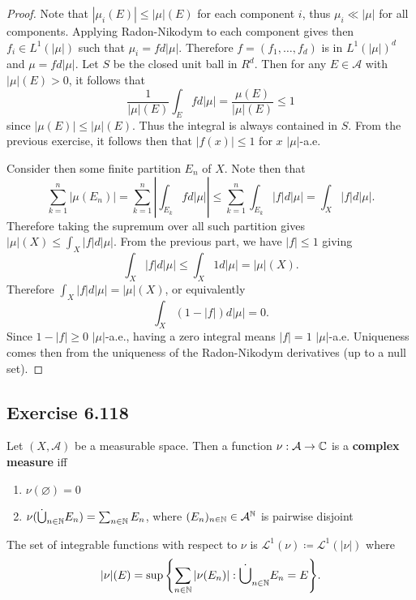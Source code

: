 \documentclass[hw_all.tex]{subfiles}
\begin{document}
\begin{proof}
    Note that $|\mu_i(E)| \leq |\mu|(E)$ for each component $i$, thus $\mu_i \ll |\mu|$ for all components. Applying Radon-Nikodym to each component gives then $f_i \in L^1(|\mu|)$ such that $\mu_i = f d |\mu|$. Therefore $f = (f_1, \ldots, f_d)$ is in $L^1(|\mu|)^d$ and $\mu = f d|\mu|$. Let $S$ be the closed unit ball in $R^d$. Then for any $E \in \mathcal{A}$ with $|\mu|(E) > 0$, it follows that
    \[
        \frac{1}{|\mu|(E)} \int_E f d|\mu| = \frac{\mu(E)}{|\mu|(E)} \leq 1
    \]
    since $|\mu(E)| \leq |\mu|(E)$. Thus the integral is always contained in $S$. From the previous exercise, it follows then that $|f(x)| \leq 1$ for $x$ $|\mu|$-a.e. 

    Consider then some finite partition $E_n$ of $X$. Note then that
    \[
        \sum_{k=1}^n |\mu(E_n)| = \sum_{k = 1}^n \left|\int_{E_k} f d|\mu|\right| \leq \sum_{k=1}^n \int_{E_k} |f| d|\mu| = \int_X |f| d|\mu|
    .\]
    Therefore taking the supremum over all such partition gives $|\mu|(X) \leq \int_X |f| d|\mu|$. From the previous part, we have $|f| \leq 1$ giving
    \[
        \int_X |f| d|\mu| \leq \int_X 1 d|\mu| = |\mu|(X)
    .\]
    Therefore $\int_X |f|d|\mu| = |\mu|(X)$, or equivalently
    \[
        \int_{X} (1 - |f|) d|\mu| = 0
    .\]
    Since $1 - |f| \geq 0$ $|\mu|$-a.e., having a zero integral means $|f| = 1$ $|\mu|$-a.e. Uniqueness comes then from the uniqueness of the Radon-Nikodym derivatives (up to a null set).
\end{proof}

\subsection*{Exercise 6.118}

\begin{definition}
    Let $(X, \mathcal{A})$ be a measurable space. Then a function $\nu : \mathcal{A} \to \mathbb{C}$ is a \textbf{complex measure} iff
    \begin{enumerate}
        \item $\nu(\varnothing) = 0$
        \item $\nu(\dot{\bigcup}_{n \in \mathbb{N}} E_n) = \sum_{n \in \mathbb{N}} E_n$, where $(E_n)_{n \in \mathbb{N}} \in \mathcal{A}^{\mathbb{N}}$ is pairwise disjoint
    \end{enumerate}

    The set of integrable functions with respect to $\nu$ is $\mathcal{L}^1(\nu) \coloneq \mathcal{L}^1(|\nu|)$ where
    \[
        |\nu|(E) = \sup\qty{ \sum_{n \in \mathbb{N}} |\nu(E_n)| : \dot{\bigcup}_{n \in \mathbb{N}} E_n = E }
    .\]
\end{definition}
\end{document}

